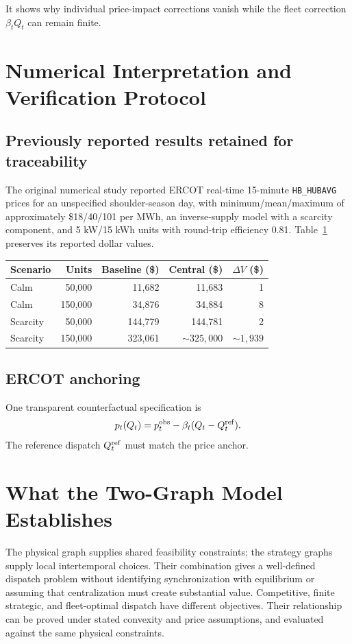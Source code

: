\documentclass[11pt]{article}
\theoremstyle{remark}
\begin{document}
It shows why
individual price-impact corrections vanish while the fleet correction
$\beta_tQ_t$ can remain finite. 


\section{Numerical Interpretation and Verification Protocol}
\label{sec:numerics}

\subsection{Previously reported results retained for traceability}
The original numerical study reported ERCOT real-time 15-minute
\texttt{HB\_HUBAVG} prices for an unspecified shoulder-season day, with
minimum/mean/maximum of approximately \$18/40/101 per MWh, an inverse-supply
model with a scarcity component, and 5 kW/15 kWh units with round-trip
efficiency 0.81. Table~\ref{tab:reported} preserves its reported dollar values.


\begin{table}[htbp]
\centering\small
\begin{tabular}{@{}lrrrr@{}}
\toprule
Scenario & Units & Baseline (\$) & Central (\$) & $\Delta V$ (\$)\\
\midrule
Calm & 50,000 & 11,682 & 11,683 & 1\\
Calm & 150,000 & 34,876 & 34,884 & 8\\
Scarcity & 50,000 & 144,779 & 144,781 & 2\\
Scarcity & 150,000 & 323,061 & $\sim325,000$ & $\sim1,939$\\
\bottomrule
\end{tabular}

\label{tab:reported}
\end{table}


\subsection{ERCOT anchoring}

One transparent counterfactual specification is
\begin{equation}
 p_t(Q_t)=p_t^{\rm obs}-\beta_t(Q_t-Q_t^{\rm ref}).
 \label{eq:historicalanchor}
\end{equation}
The reference dispatch $Q_t^{\rm ref}$ must match the price anchor.



\section{What the Two-Graph Model Establishes}
The physical graph supplies shared feasibility constraints; the strategy
graphs supply local intertemporal choices. Their combination gives a
well-defined dispatch problem without identifying synchronization with
equilibrium or assuming that centralization must create substantial value.
Competitive, finite strategic, and fleet-optimal dispatch have different
objectives. Their relationship can be proved under stated convexity and
price assumptions, and evaluated against the same physical constraints.
\end{document}
